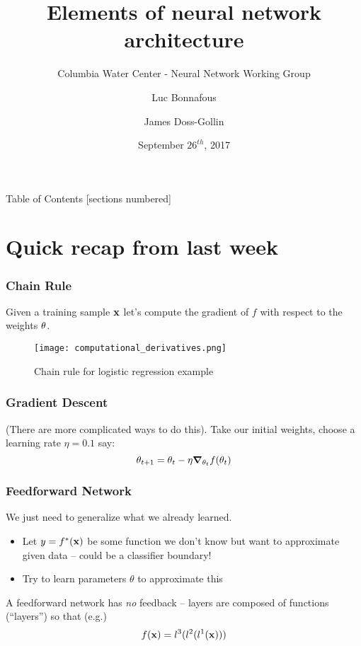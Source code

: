\documentclass{beamer}
\title[Your Short Title]{Elements of neural network architecture}
\subtitle{Columbia Water Center - Neural Network Working Group}
\author{Luc Bonnafous \and James Doss-Gollin}
\institute{Columbia University}
\date{September $26^{th}$, 2017}
\makeatletter
\newcommand*{\eg}{e.g.\@\xspace}
\makeatother
\begin{document}
\maketitle

\begin{frame}{Table of Contents}
  [sections numbered]
  \tableofcontents[hideallsubsections]
\end{frame}

\section{Quick recap from last week}
\begin{frame}
	\frametitle{Chain Rule}
	Given a training sample $\vb{x}$ let’s compute the gradient of $f$ with respect to the weights $\vb{\theta}$.
	\begin{figure}
		\texttt{[image: computational\_derivatives.png]}
		\caption{Chain rule for logistic regression example}
	\end{figure}
\end{frame}
\begin{frame}
	\frametitle{Gradient Descent}
	(There are more complicated ways to do this).
	Take our initial weights, choose a learning rate $\eta = 0.1$ say:
	\begin{equation}
		\vb{\theta}_{t+1} = \vb{\theta}_t - \eta \grad_{\vb{\theta}_t} f (\vb{\theta}_t)
	\end{equation}
\end{frame}

\begin{frame}
	\frametitle{Feedforward Network}
	We just need to generalize what we already learned.
	\begin{itemize}
		\item Let $y = f^*(\vb{x})$ be some function we don't know but want to approximate given data -- could be a classifier boundary!
		\item Try to learn parameters $\theta$ to approximate this
	\end{itemize}
	A feedforward network has \emph{no} feedback -- layers are composed of functions (``layers'') so that (\eg)
	\begin{equation}
		f (\vb{x}) = l^3(l^2(l^1(\vb{x})))
	\end{equation}
\end{frame}
\end{document}
